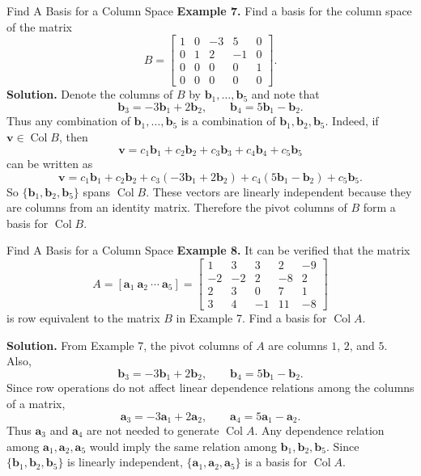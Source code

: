 \documentclass[aspectratio=169]{beamer}
\newcommand{\vect}[1]{\mathbf{#1}}
\newcommand{\Col}{\operatorname{Col}}
\begin{document}
\begin{frame}{Find A Basis for a Column Space}
\scriptsize
\setlength{\abovedisplayskip}{3pt}
\setlength{\belowdisplayskip}{3pt}
\textbf{Example 7.} Find a basis for the column space of the matrix
\[
B=
\begin{bmatrix}
1&0&-3&5&0\\
0&1&2&-1&0\\
0&0&0&0&1\\
0&0&0&0&0
\end{bmatrix}.
\]
\textbf{Solution.} Denote the columns of $B$ by $\vect b_1,\ldots,\vect b_5$ and note that
\[
\vect b_3=-3\vect b_1+2\vect b_2,
\qquad
\vect b_4=5\vect b_1-\vect b_2.
\]
Thus any combination of $\vect b_1,\ldots,\vect b_5$ is a combination of
$\vect b_1,\vect b_2,\vect b_5$. Indeed, if $\vect v\in\Col B$, then
\[
\vect v=c_1\vect b_1+c_2\vect b_2+c_3\vect b_3+c_4\vect b_4+c_5\vect b_5
\]
can be written as
\[
\vect v=c_1\vect b_1+c_2\vect b_2
+c_3(-3\vect b_1+2\vect b_2)+c_4(5\vect b_1-\vect b_2)+c_5\vect b_5.
\]
So $\{\vect b_1,\vect b_2,\vect b_5\}$ spans $\Col B$. These vectors are linearly independent because they are columns from an identity matrix. Therefore the pivot columns of $B$ form a basis for $\Col B$.
\end{frame}

\begin{frame}{Find A Basis for a Column Space}
\scriptsize
\setlength{\abovedisplayskip}{3pt}
\setlength{\belowdisplayskip}{3pt}
\textbf{Example 8.} It can be verified that the matrix
\[
A=[\vect a_1\ \vect a_2\ \cdots\ \vect a_5]
=
\begin{bmatrix}
1&3&3&2&-9\\
-2&-2&2&-8&2\\
2&3&0&7&1\\
3&4&-1&11&-8
\end{bmatrix}
\]
is row equivalent to the matrix $B$ in Example 7. Find a basis for $\Col A$.

\medskip
\textbf{Solution.} From Example 7, the pivot columns of $A$ are columns $1$, $2$, and $5$. Also,
\[
\vect b_3=-3\vect b_1+2\vect b_2,
\qquad
\vect b_4=5\vect b_1-\vect b_2.
\]
Since row operations do not affect linear dependence relations among the columns of a matrix,
\[
\vect a_3=-3\vect a_1+2\vect a_2,
\qquad
\vect a_4=5\vect a_1-\vect a_2.
\]
Thus $\vect a_3$ and $\vect a_4$ are not needed to generate $\Col A$. Any dependence relation among $\vect a_1,\vect a_2,\vect a_5$ would imply the same relation among $\vect b_1,\vect b_2,\vect b_5$. Since $\{\vect b_1,\vect b_2,\vect b_5\}$ is linearly independent, $\boxed{\{\vect a_1,\vect a_2,\vect a_5\}}$ is a basis for $\Col A$.
\end{frame}
\end{document}
